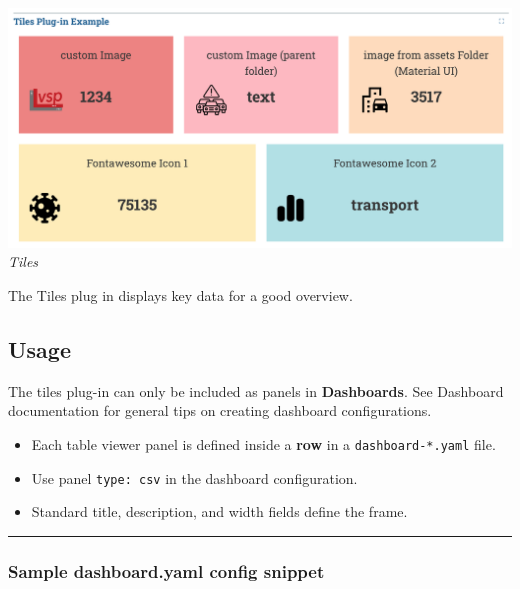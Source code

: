 \includegraphics{assets/tiles_light_mode.png} \emph{Tiles}

The Tiles plug in displays key data for a good overview.

\hypertarget{usage}{%
\subsection{Usage}\label{usage}}

The tiles plug-in can only be included as panels in \textbf{Dashboards}.
See Dashboard documentation for general tips on creating dashboard
configurations.

\begin{itemize}
\tightlist
\item
  Each table viewer panel is defined inside a \textbf{row} in a
  \texttt{dashboard-*.yaml} file.
\item
  Use panel \texttt{type:\ csv} in the dashboard configuration.
\item
  Standard title, description, and width fields define the frame.
\end{itemize}

\begin{center}\rule{0.5\linewidth}{0.5pt}\end{center}

\hypertarget{sample-dashboard.yaml-config-snippet}{%
\subsubsection{Sample dashboard.yaml config
snippet}\label{sample-dashboard.yaml-config-snippet}}

\begin{Shaded}
\begin{Highlighting}[]
\KeywordTok{:}
\AttributeTok{  }\KeywordTok{:}
\AttributeTok{    }\KeywordTok{{-}}\AttributeTok{ }\KeywordTok{:}\AttributeTok{ }
\AttributeTok{      }\KeywordTok{:}
\AttributeTok{      }\KeywordTok{:}\AttributeTok{ }
\end{Highlighting}
\end{Shaded}

